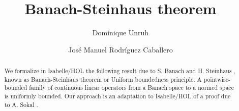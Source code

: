 \documentclass[11pt,a4paper]{article}
\begin{document}
\title{Banach-Steinhaus theorem}
\author{Dominique Unruh \and Jos\'e Manuel Rodr\'iguez Caballero}
\maketitle

\begin{abstract}
We formalize in Isabelle/HOL the following result \cite{Weisstein_UBP} due to S. Banach and H. Steinhaus \cite{banach1927principe}, known as Banach-Steinhaus theorem or Uniform boundedness principle: A pointwise-bounded family of continuous linear operators from a Banach space to a normed space is uniformly bounded. Our approach is an adaptation to Isabelle/HOL of a proof due to A. Sokal \cite{sokal2011really}.
\end{abstract}

\tableofcontents






\end{document}
